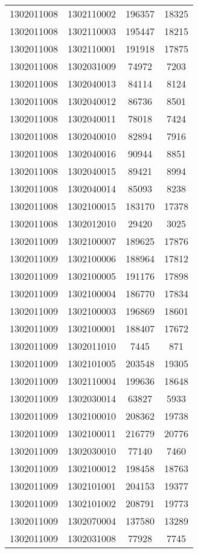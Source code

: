 \begin{longtable}[h]{llcc}
		1302011008 & 1302110002 & 196357 & 18325\\
		1302011008 & 1302110003 & 195447 & 18215\\
		1302011008 & 1302110001 & 191918 & 17875\\
		1302011008 & 1302031009 & 74972 & 7203\\
		1302011008 & 1302040013 & 84114 & 8124\\
		1302011008 & 1302040012 & 86736 & 8501\\
		1302011008 & 1302040011 & 78018 & 7424\\
		1302011008 & 1302040010 & 82894 & 7916\\
		1302011008 & 1302040016 & 90944 & 8851\\
		1302011008 & 1302040015 & 89421 & 8994\\
		1302011008 & 1302040014 & 85093 & 8238\\
		1302011008 & 1302100015 & 183170 & 17378\\
		1302011008 & 1302012010 & 29420 & 3025\\
		1302011009 & 1302100007 & 189625 & 17876\\
		1302011009 & 1302100006 & 188964 & 17812\\
		1302011009 & 1302100005 & 191176 & 17898\\
		1302011009 & 1302100004 & 186770 & 17834\\
		1302011009 & 1302100003 & 196869 & 18601\\
		1302011009 & 1302100001 & 188407 & 17672\\
		1302011009 & 1302011010 & 7445 & 871\\
		1302011009 & 1302101005 & 203548 & 19305\\
		1302011009 & 1302110004 & 199636 & 18648\\
		1302011009 & 1302030014 & 63827 & 5933\\
		1302011009 & 1302100010 & 208362 & 19738\\
		1302011009 & 1302100011 & 216779 & 20776\\
		1302011009 & 1302030010 & 77140 & 7460\\
		1302011009 & 1302100012 & 198458 & 18763\\
		1302011009 & 1302101001 & 204153 & 19377\\
		1302011009 & 1302101002 & 208791 & 19773\\
		1302011009 & 1302070004 & 137580 & 13289\\
		1302011009 & 1302031008 & 77928 & 7745\\

\end{longtable}
